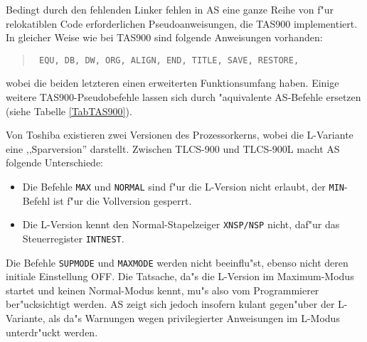 \documentclass[12pt,a4paper,twoside]{report}
\newcommand{\tty}[1]{{\tt #1}}
\begin{document}
Bedingt durch den fehlenden Linker fehlen in AS eine ganze Reihe von f"ur
relokatiblen Code erforderlichen Pseudoanweisungen, die TAS900 implementiert.
In gleicher Weise wie bei TAS900 sind folgende Anweisungen vorhanden:
\begin{quote}{\tt
EQU, DB, DW, ORG, ALIGN, END, TITLE, SAVE, RESTORE,
}\end{quote}
wobei die beiden letzteren einen erweiterten Funktionsumfang haben.
Einige weitere TAS900-Pseudobefehle lassen sich durch "aquivalente AS-Befehle
ersetzen (siehe Tabelle \ref{TabTAS900}).
\par
Von Toshiba existieren zwei Versionen des Prozessorkerns, wobei die
L-Variante eine ,,Sparversion'' darstellt.  Zwischen TLCS-900 und TLCS-900L
macht AS folgende Unterschiede:
\begin{itemize}
\item{Die Befehle \tty{MAX} und \tty{NORMAL} sind f"ur die L-Version
      nicht erlaubt, der \tty{MIN}-Befehl ist f"ur die Vollversion
      gesperrt.}
\item{Die L-Version kennt den Normal-Stapelzeiger \tty{XNSP/NSP} nicht,
      daf"ur das Steuerregister \tty{INTNEST}.}
\end{itemize}
Die Befehle \tty{SUPMODE} und \tty{MAXMODE} werden nicht beeinflu"st,
ebenso nicht deren ini\-tiale Einstellung OFF.  Die Tatsache, da"s die
L-Version im Maximum-Modus startet und keinen Normal-Modus kennt, mu"s
also vom Programmierer ber"ucksichtigt werden.  AS zeigt sich jedoch
insofern kulant gegen"uber der L-Variante, als da"s Warnungen wegen
privilegierter Anweisungen im L-Modus unterdr"uckt werden.
\end{document}
